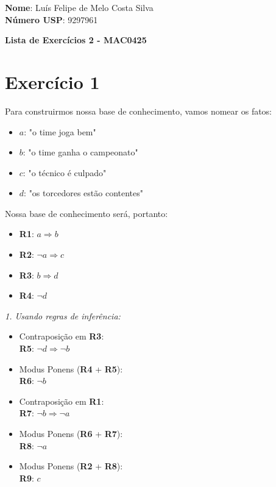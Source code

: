 \documentclass[12pt,letterpaper]{article}
\begin{document}
	
	\large \textbf{Nome}: Luís Felipe de Melo Costa Silva \\
	\textbf{Número USP}: 9297961 
    
	\begin{center}
		\LARGE \bf
		Lista de Exercícios 2 - MAC0425
	\end{center}
	
	\section*{Exercício 1}
	
	Para construirmos nossa base de conhecimento, vamos nomear os fatos:
	
	\begin{itemize}
		\item $a$: "o time joga bem"
		\item $b$: "o time ganha o campeonato"
		\item $c$: "o técnico é culpado"
		\item $d$: "os torcedores estão contentes"
	\end{itemize}
	
	Nossa base de conhecimento será, portanto:
	
	\begin{multicols}{4}
		\begin{itemize}
			\item \textbf{R1}: $a \Rightarrow b$
			\item \textbf{R2}: $\lnot a \Rightarrow c$
			\item \textbf{R3}: $b \Rightarrow d$
			\item \textbf{R4}: $\lnot d$
		\end{itemize}
	\end{multicols}
	
	\textit{1. Usando regras de inferência:}
	
	\begin{itemize}
		\item Contraposição em \textbf{R3}: \\ \textbf{R5}: $\lnot d \Rightarrow \lnot b$
		\item Modus Ponens (\textbf{R4} + \textbf{R5}): \\ \textbf{R6}: $\lnot b$
		\item Contraposição em \textbf{R1}: \\ \textbf{R7}: $\lnot b \Rightarrow \lnot a$
		\item Modus Ponens (\textbf{R6} + \textbf{R7}): \\ \textbf{R8}: $\lnot a$
		\item Modus Ponens (\textbf{R2} + \textbf{R8}): \\ \textbf{R9}: $c$		
	\end{itemize}
	
\end{document}
